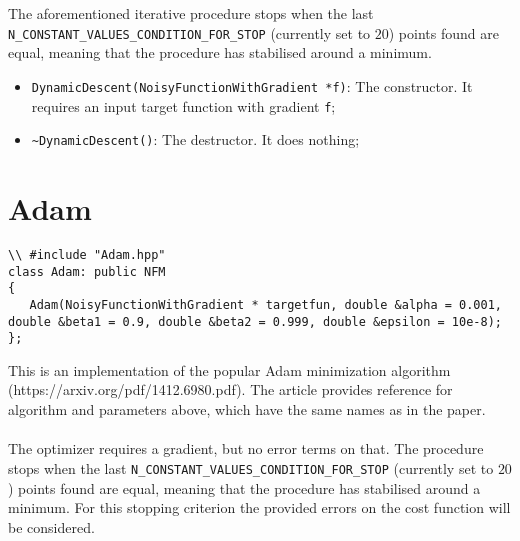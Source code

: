 \documentclass[11pt,a4paper,twoside]{article}
\begin{document}
The aforementioned iterative procedure stops when the last \verb+N_CONSTANT_VALUES_CONDITION_FOR_STOP+ (currently set to $20$) points found are equal, meaning that the procedure has stabilised around a minimum.

\begin{itemize}
\item \verb+DynamicDescent(NoisyFunctionWithGradient *f)+: The constructor. It requires an input target function with gradient \verb+f+;
\item \verb+~DynamicDescent()+: The destructor. It does nothing;
\end{itemize}



\section{Adam} %
\label{sec:adam}

\begin{lstlisting}
\\ #include "Adam.hpp"
class Adam: public NFM
{
   Adam(NoisyFunctionWithGradient * targetfun, double &alpha = 0.001, double &beta1 = 0.9, double &beta2 = 0.999, double &epsilon = 10e-8);
};
\end{lstlisting}

This is an implementation of the popular Adam minimization algorithm (https://arxiv.org/pdf/1412.6980.pdf). The article provides reference for algorithm and parameters above, which have the same names as in the paper.
\\\\The optimizer requires a gradient, but no error terms on that. The procedure stops when the last \verb+N_CONSTANT_VALUES_CONDITION_FOR_STOP+ (currently set to $20$) points found are equal, meaning that the procedure has stabilised around a minimum. For this stopping criterion the provided errors on the cost function will be considered.


\printindex
\end{document}
